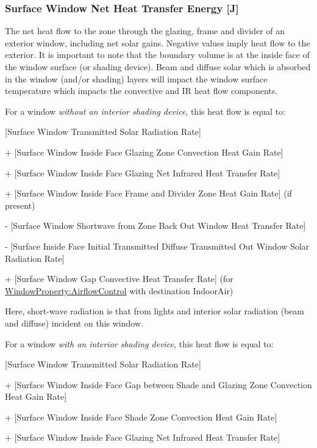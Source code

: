 \subsubsection{Surface Window Net Heat Transfer Energy {[}J{]}}\label{surface-window-net-heat-transfer-rate-j}

The net heat flow to the zone through the glazing, frame and divider of an exterior window, including net solar gains. Negative values imply heat flow to the exterior. It is important to note that the boundary volume is at the inside face of the window surface (or shading device). Beam and diffuse solar which is absorbed in the window (and/or shading) layers will impact the window surface temperature which impacts the convective and IR heat flow components.

For a window \emph{without an interior shading device}, this heat flow is equal to:

  {[}Surface Window Transmitted Solar Radiation Rate{]}

  + {[}Surface Window Inside Face Glazing Zone Convection Heat Gain Rate{]}

  + {[}Surface Window Inside Face Glazing Net Infrared Heat Transfer Rate{]}

  + {[}Surface Window Inside Face Frame and Divider Zone Heat Gain Rate{]} (if present)

  - {[}Surface Window Shortwave from Zone Back Out Window Heat Transfer Rate{]}

  - {[}Surface Inside Face Initial Transmitted Diffuse Transmitted Out Window Solar Radiation Rate{]}

  + {[Surface Window Gap Convective Heat Transfer Rate] (for \hyperref[windowpropertyairflowcontrol]{WindowProperty:AirflowControl} with destination IndoorAir)}

Here, short-wave radiation is that from lights and interior solar radiation (beam and diffuse) incident on this window.

For a window \emph{with an interior shading device}, this heat flow is equal to:

  {[}Surface Window Transmitted Solar Radiation Rate{]}

  + {[}Surface Window Inside Face Gap between Shade and Glazing Zone Convection Heat Gain Rate{]}

  + {[}Surface Window Inside Face Shade Zone Convection Heat Gain Rate{]}

  + {[}Surface Window Inside Face Glazing Net Infrared Heat Transfer Rate{]}

